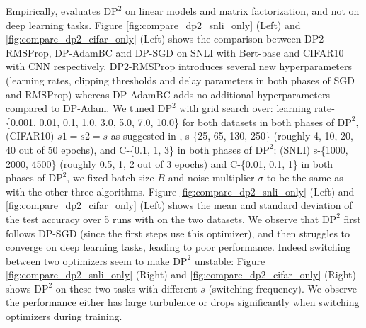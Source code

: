\documentclass[letterpaper]{article} %
\begin{document}
Empirically, \citet{lidp2} evaluates $\textrm{DP}^2$ on linear models and matrix factorization, and not on deep learning tasks. Figure \ref{fig:compare_dp2_snli_only} (Left) and \ref{fig:compare_dp2_cifar_only} (Left)  shows the comparison between DP2-RMSProp, DP-AdamBC and DP-SGD on SNLI with Bert-base and CIFAR10 with CNN respectively. DP2-RMSProp introduces several new hyperparameters (learning rates, clipping thresholds and delay parameters in both phases of SGD and RMSProp) whereas DP-AdamBC adds no additional hyperparameters compared to DP-Adam. We tuned $\textrm{DP}^2$ with grid search over: learning rate-\{0.001, 0.01, 0.1, 1.0, 3.0, 5.0, 7.0, 10.0\} for both datasets in both phases of $\textrm{DP}^2$, (CIFAR10) $s1=s2=s$ as suggested in \citet{lidp2}, s-\{25, 65, 130, 250\} (roughly 4, 10, 20, 40 out of 50 epochs), and C-\{0.1, 1, 3\} in both phases of $\textrm{DP}^2$; (SNLI) s-\{1000, 2000, 4500\} (roughly 0.5, 1, 2 out of 3 epochs) and C-\{0.01, 0.1, 1\} in both phases of $\textrm{DP}^2$, we fixed batch size $B$ and noise multiplier $\sigma$ to be the same as with the other three algorithms. Figure \ref{fig:compare_dp2_snli_only} (Left) and \ref{fig:compare_dp2_cifar_only} (Left) shows the mean and standard deviation of the test accuracy over 5 runs with on the two datasets. We observe that $\textrm{DP}^2$ first follows DP-SGD (since the first steps use this optimizer), and then struggles to converge on deep learning tasks, leading to poor performance. Indeed switching between two optimizers seem to make $\textrm{DP}^2$ unstable: Figure \ref{fig:compare_dp2_snli_only} (Right) and \ref{fig:compare_dp2_cifar_only} (Right) shows $\textrm{DP}^2$ on these two tasks with different $s$ (switching frequency). We observe the performance either has large turbulence or drops significantly when switching optimizers during training.


\end{document}
